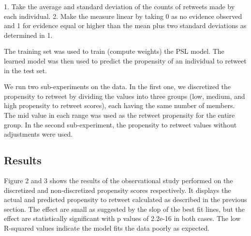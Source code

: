 1. Take the average and standard deviation of the counts of retweets made by each individual.
2. Make the measure linear by taking 0 as no evidence observed and 1 for evidence equal or higher than the mean plus two standard deviations as determined in 1.

The training set was used to train (compute weights) the PSL model.  The learned model was then used to predict the propensity of an individual to retweet in the test set.

We run two sub-experiments on the data.  In the first one, we discretized the propensity to retweet by dividing the values into three groups (low, medium, and high propensity to retweet scores), each having the same number of members.  The mid value in each range was used as the retweet propensity for the entire group.  In the second sub-experiment, the propensity to retweet values without adjustments were used.

\subsection{Results}
Figure 2 and 3 shows the results of the observational study performed on the discretized and non-discretized propensity scores respectively. It displays the actual and predicted propensity to retweet calculated as described in the previous section.   The effect are small as suggested by the slop of the best fit lines, but the effect are statistically significant with p values of 2.2e-16 in both cases.  The low R-squared values indicate the model fits the data poorly as expected.  

